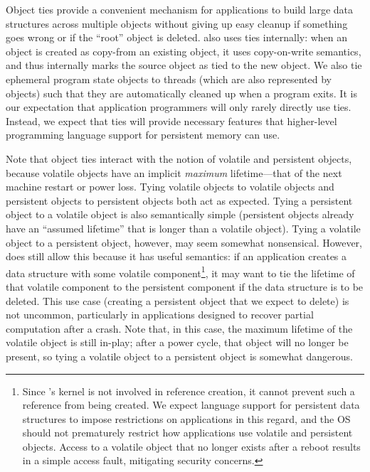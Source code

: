 {    Object ties provide a convenient mechanism for applications to build large data structures across
    multiple objects without giving up easy cleanup if something goes wrong or if the ``root'' object is
    deleted. \Twizzler also uses ties internally: when an object is created as copy-from an existing
    object, it uses copy-on-write semantics, and thus internally marks the source object as tied to the
    new object. We also tie ephemeral program state objects to threads (which are also represented by
    objects) such that they are automatically cleaned up when a program exits. It is our expectation
    that application programmers will only rarely directly use ties. Instead, we expect that ties will
    provide necessary features that higher-level programming language support for persistent memory can
    use.

    Note that object ties interact with the notion of volatile and persistent objects, because
    volatile objects have an implicit \emph{maximum} lifetime---that of the next machine restart or
    power loss. Tying volatile objects to volatile objects and persistent objects to persistent objects both act as
    expected. Tying a persistent object to a volatile object is also semantically simple (persistent
    objects already have an ``assumed lifetime'' that is longer than a volatile object). Tying a
    volatile object to a persistent object, however, may seem somewhat nonsensical. However, \Twizzler
    does still allow this because it has useful semantics: if an application creates a data structure
    with some volatile component\footnote{Since \Twizzler's kernel is not involved in reference
        creation, it cannot prevent such a reference from being created. We expect language support for
        persistent data structures to impose restrictions on applications in this regard, and the OS should
        not prematurely restrict how applications use volatile and persistent objects. Access to a volatile
        object that no longer exists after a reboot results in a simple access fault, mitigating security
        concerns.},
    it may want to tie the lifetime of that volatile component to the
    persistent component if the data structure is to be deleted. This use case (creating a persistent
    object that we expect to delete) is not uncommon, particularly in applications designed to recover
    partial computation after a crash. Note that, in this case, the maximum
    lifetime of the volatile object is still in-play; after a power cycle, that object will no longer be
    present, so tying a volatile object to a persistent object is somewhat dangerous.

}


